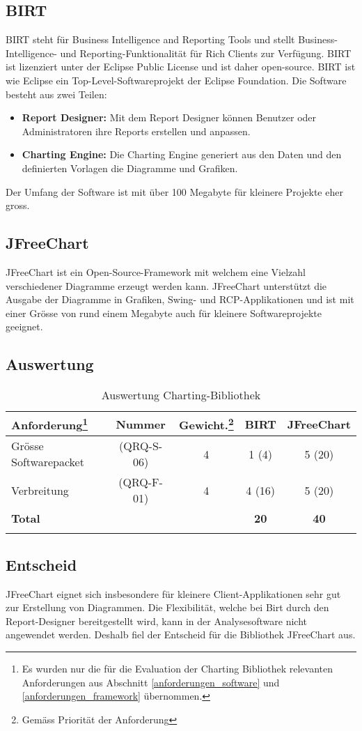 \subsection{BIRT}
BIRT steht für Business Intelligence and Reporting Tools und stellt Business-Intelligence- und Reporting-Funktionalität für Rich Clients zur Verfügung. BIRT ist lizenziert unter der Eclipse Public License und ist daher open-source. BIRT ist wie Eclipse ein Top-Level-Softwareprojekt der Eclipse Foundation. Die Software besteht aus zwei Teilen:
\begin{itemize}
\item \textbf{Report Designer: }Mit dem Report Designer können Benutzer oder Administratoren ihre Reports erstellen und anpassen. 
\item \textbf{Charting Engine: }Die Charting Engine generiert aus den Daten und den definierten Vorlagen die Diagramme und Grafiken.
\end{itemize} 

Der Umfang der Software ist mit über 100 Megabyte für kleinere Projekte eher gross.

\subsection{JFreeChart}
JFreeChart ist ein Open-Source-Framework mit welchem eine Vielzahl verschiedener Diagramme erzeugt werden kann. JFreeChart unterstützt die Ausgabe der Diagramme in Grafiken, Swing- und RCP-Applikationen und ist mit einer Grösse von rund einem Megabyte auch für kleinere Softwareprojekte geeignet.

\subsection{Auswertung}
\begin{longtable}{|p{4cm}|c|c|c|c|}\hline
 \textbf{Anforderung\footnote{Es wurden nur die für die Evaluation der Charting Bibliothek relevanten Anforderungen aus Abschnitt \ref{anforderungen_software} und \ref{anforderungen_framework} übernommen.}} & \textbf{Nummer} &  \textbf{Gewicht.\footnote{Gemäss Priorität der Anforderung}} & \textbf{BIRT} & \textbf{JFreeChart}\\\hline
   Grösse Softwarepacket & (QRQ-S-06) & 4 & 1 (4) & 5 (20) \\\hline
   Verbreitung & (QRQ-F-01) & 4 & 4 (16) & 5 (20) \\\hline
   \textbf{Total} & && \textbf{20}  & \textbf{40} \\\hline
    \caption{Auswertung Charting-Bibliothek}
\end{longtable}

\subsection{Entscheid}
JFreeChart eignet sich insbesondere für kleinere Client-Applikationen sehr gut zur Erstellung von Diagrammen. Die Flexibilität, welche bei Birt durch den Report-Designer bereitgestellt wird, kann in der Analysesoftware nicht angewendet werden. Deshalb fiel der Entscheid für die Bibliothek JFreeChart aus.
